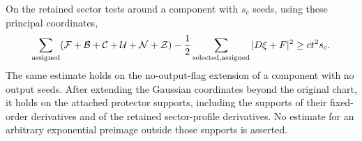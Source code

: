 \begin{lemma}
\label{rg:core-reserve}
On the retained sector tests around a component with $s_c$ seeds,
using these principal coordinates,
\begin{equation}
 \sum_{\rm assigned}(\mathcal F+\mathcal B+\mathcal C+
                           \mathcal U+\mathcal N+\mathcal Z)
 -\frac12\sum_{\rm selected,assigned}|D\xi+F|^2
                   \ge c t^2s_c.
 \label{rg:reserve}
\end{equation}
The same estimate holds on the no-output-flag extension of a
component with no output seeds.  After extending the Gaussian
coordinates beyond the original chart, it holds on the attached
protector supports, including the supports of their
fixed-order derivatives and of the retained sector-profile
derivatives.  No estimate for an arbitrary exponential preimage
outside those supports is asserted.
\end{lemma}
